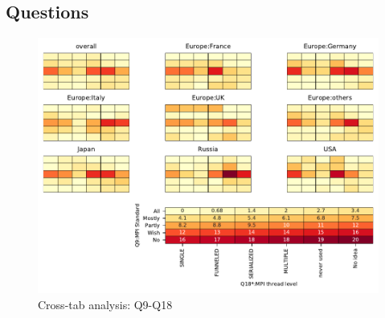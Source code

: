 
\subsection{Questions}


\begin{figure}
\begin{center}
\includegraphics[width=12cm]{../pdfs/Q9-Q18.pdf}
\caption{Cross-tab analysis: Q9-Q18}
\label{fig:Q9-Q18}
\end{center}
\end{figure}
